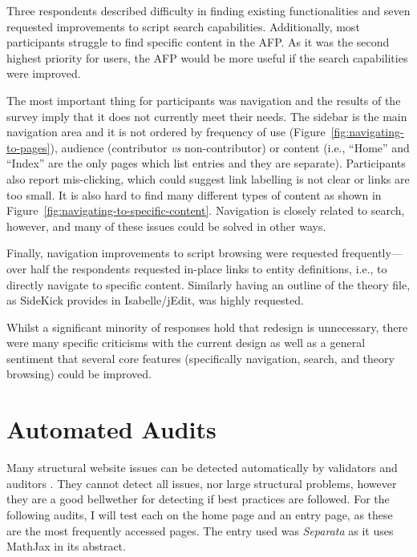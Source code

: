 \documentclass[bsc,frontabs,oneside,singlespacing,parskip,deptreport,logo]{infthesis}
\begin{document}
Three respondents described difficulty in finding existing functionalities and seven requested improvements to script search capabilities. Additionally, most participants struggle to find specific content in the AFP\@. As it was the second highest priority for users, the AFP would be more useful if the search capabilities were improved.\smallskip

The most important thing for participants was navigation and the results of the survey imply that it does not currently meet their needs. The sidebar is the main navigation area and it is not ordered by frequency of use (Figure~\ref{fig:navigating-to-pages}), audience (contributor \emph{vs} non-contributor) or content (i.e., ``Home'' and ``Index'' are the only pages which list entries and they are separate). Participants also report mis-clicking, which could suggest link labelling is not clear or links are too small. It is also hard to find many different types of content as shown in Figure~\ref{fig:navigating-to-specific-content}. Navigation is closely related to search, however, and many of these issues could be solved in other ways. \smallskip

Finally, navigation improvements to script browsing were requested frequently---over half the respondents requested in-place links to entity definitions, i.e., to directly navigate to specific content. Similarly having an outline of the theory file, as SideKick provides in Isabelle/jEdit, was highly requested.

Whilst a significant minority of responses hold that redesign is unnecessary, there were many specific criticisms with the current design as well as a general sentiment that several core features (specifically navigation, search, and theory browsing) could be improved. \smallskip

\section{Automated Audits} \label{automated_current}

Many structural website issues can be detected automatically by validators and auditors \cite{ivory2013automated}. They cannot detect all issues, nor large structural problems, however they are a good bellwether for detecting if best practices are followed. For the following audits, I will test each on the home page and an entry page, as these are the most frequently accessed pages. The entry used was \emph{Separata} as it uses MathJax in its abstract.
\end{document}

